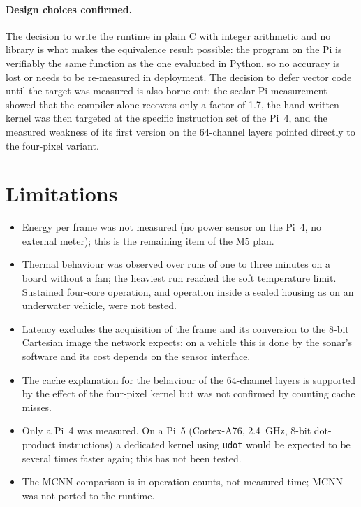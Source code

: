 \documentclass[11pt,a4paper]{article}
\begin{document}
\paragraph{Design choices confirmed.} The decision to write the runtime in
plain C with integer arithmetic and no library is what makes the
equivalence result possible: the program on the Pi is verifiably the same
function as the one evaluated in Python, so no accuracy is lost or needs to
be re-measured in deployment. The decision to defer vector code until the
target was measured is also borne out: the scalar Pi measurement showed that
the compiler alone recovers only a factor of 1.7, the hand-written kernel
was then targeted at the specific instruction set of the Pi~4, and the
measured weakness of its first version on the 64-channel layers pointed
directly to the four-pixel variant.

\section{Limitations}

\begin{itemize}
  \item Energy per frame was not measured (no power sensor on the Pi~4, no
  external meter); this is the remaining item of the M5 plan.
  \item Thermal behaviour was observed over runs of one to three minutes on
  a board without a fan; the heaviest run reached the soft temperature
  limit. Sustained four-core operation, and operation inside
  a sealed housing as on an underwater vehicle, were not tested.
  \item Latency excludes the acquisition of the frame and its conversion to
  the $8$-bit Cartesian image the network expects; on a vehicle this is done
  by the sonar's software and its cost depends on the sensor interface.
  \item The cache explanation for the behaviour of the 64-channel layers is
  supported by the effect of the four-pixel kernel but was not confirmed by
  counting cache misses.
  \item Only a Pi~4 was measured. On a Pi~5 (Cortex-A76, \SI{2.4}{GHz},
  8-bit dot-product instructions) a dedicated kernel using \texttt{udot}
  would be expected to be several times faster again; this has not been
  tested.
  \item The MCNN comparison is in operation counts, not measured time;
  MCNN was not ported to the runtime.
\end{itemize}
\end{document}
